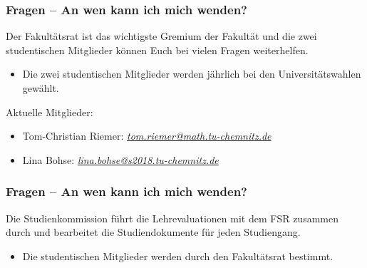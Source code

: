 \documentclass[10pt]{beamer}
\begin{document}
\begin{frame}
	\frametitle{Fragen -- An wen kann ich mich wenden?}

	\begin{block}{\vphantom{X}}
		Der Fakultätsrat ist das wichtigste Gremium der Fakultät und die zwei studentischen Mitglieder können Euch bei vielen Fragen weiterhelfen.
	\end{block}

	\begin{itemize}
		\item Die zwei studentischen Mitglieder werden jährlich bei den Universitätswahlen gewählt.
	\end{itemize}

	Aktuelle Mitglieder:

	\begin{itemize}
		\item Tom-Christian Riemer: \textit{\href{mailto:tom.riemer@math.tu-chemnitz.de}{tom.riemer@math.tu-chemnitz.de}}
		\item Lina Bohse: \textit{\href{mailto:lina.bohse@s2018.tu-chemnitz.de}{lina.bohse@s2018.tu-chemnitz.de}}   
	\end{itemize}
\end{frame}

\begin{frame}
	\frametitle{Fragen -- An wen kann ich mich wenden?}

	\begin{block}{\vphantom{X}}
		Die Studienkommission führt die Lehrevaluationen mit dem FSR zusammen durch und bearbeitet die Studiendokumente für jeden Studiengang.
	\end{block}

	\begin{itemize}
		\item Die studentischen Mitglieder werden durch den Fakultätsrat bestimmt.
	\end{itemize}
\end{frame}
\end{document}
